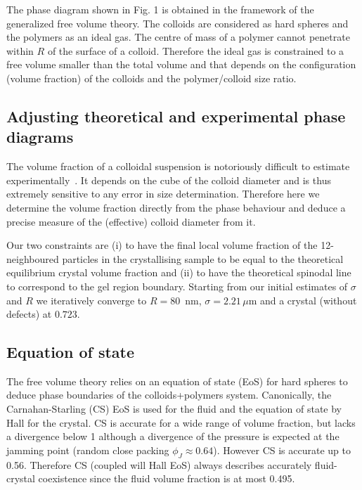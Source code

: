 The phase diagram shown in Fig. 1 is obtained in the framework of the generalized free volume theory. The colloids are considered as hard spheres and the polymers as an ideal gas. The centre of mass of a polymer cannot penetrate within $R$ of the surface of a colloid. Therefore the ideal gas is constrained to a free volume smaller than the total volume and that depends on the configuration (volume fraction) of the colloids and the polymer/colloid size ratio. 

\subsection*{Adjusting theoretical and experimental phase diagrams}


The volume fraction of a colloidal suspension is notoriously difficult to estimate experimentally~\cite{Poon2012}. It depends on the cube of the colloid diameter and is thus extremely sensitive to any error in size determination. Therefore here we determine the volume fraction directly from the phase behaviour and deduce a precise measure of the (effective) colloid diameter from it.

Our two constraints are (i) to have the final local volume fraction of the 12-neighboured particles in the crystallising sample to be equal to the theoretical equilibrium crystal volume fraction and (ii) to have the theoretical spinodal line to correspond to the gel region boundary. Starting from our initial estimates of $\sigma$ and $R$ we iteratively converge to $R=80$~nm, $\sigma = 2.21\,\mu$m and a crystal (without defects) at $0.723$.

\subsection*{Equation of state}

The free volume theory relies on an equation of state (EoS) for hard spheres to deduce phase boundaries of the colloids+polymers system. Canonically, the Carnahan-Starling (CS) EoS is used for the fluid and the equation of state by Hall for the crystal. CS is accurate for a wide range of volume fraction, but lacks a divergence below 1 although a divergence of the pressure is expected at the jamming point (random close packing $\phi_J\approx 0.64$). However CS is accurate up to 0.56. Therefore CS (coupled will Hall EoS) always describes accurately fluid-crystal coexistence since the fluid volume fraction is at most 0.495.

